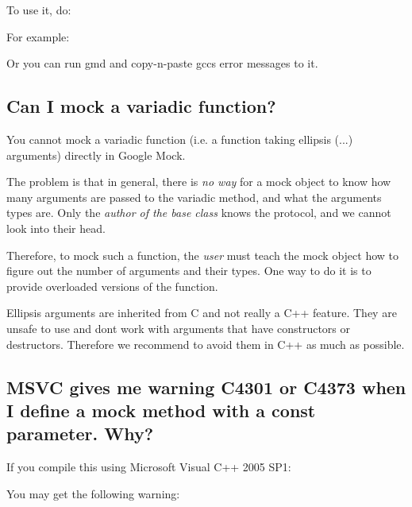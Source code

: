 To use it, do\+: 
\begin{DoxyCode}{0}
\end{DoxyCode}


For example\+: 
\begin{DoxyCode}{0}
\end{DoxyCode}


Or you can run {\ttfamily gmd} and copy-\/n-\/paste gcc\textquotesingle{}s error messages to it.

\subsection*{Can I mock a variadic function?}

You cannot mock a variadic function (i.\+e. a function taking ellipsis ({\ttfamily ...}) arguments) directly in Google Mock.

The problem is that in general, there is {\itshape no way} for a mock object to know how many arguments are passed to the variadic method, and what the arguments\textquotesingle{} types are. Only the {\itshape author of the base class} knows the protocol, and we cannot look into their head.

Therefore, to mock such a function, the {\itshape user} must teach the mock object how to figure out the number of arguments and their types. One way to do it is to provide overloaded versions of the function.

Ellipsis arguments are inherited from C and not really a C++ feature. They are unsafe to use and don\textquotesingle{}t work with arguments that have constructors or destructors. Therefore we recommend to avoid them in C++ as much as possible.

\subsection*{M\+S\+VC gives me warning C4301 or C4373 when I define a mock method with a const parameter. Why?}

If you compile this using Microsoft Visual C++ 2005 S\+P1\+: 
\begin{DoxyCode}{0}
\DoxyCodeLine{\};}
\DoxyCodeLine{}
\DoxyCodeLine{\};}
\end{DoxyCode}
 You may get the following warning\+: 
\begin{DoxyCode}{0}
\end{DoxyCode}


